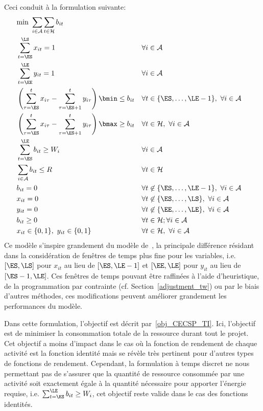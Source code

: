 Ceci conduit à la formulation suivante:
{\small
 \begin{align} &\text{min }
\sum_{i\in \A}\sum_{t \in \H} b_{it}
\label{obj_CECSP_TI}\\ &\sum_{t=\ES}^{\LS} x_{it} = 1 & &\forall i
\in \A \label{start_CECSP_TI}\\ &\sum_{t=\EE}^{\LE} y_{it} =
1 & & \forall i \in \A
\label{end_CECSP_TI}\\&\left(\sum_{\tau=\ES}^{t} x_{i\tau}
-\sum_{\tau=\ES+1}^{t} y_{i\tau}\right)\bmin \le b_{it} & &
\forall t \in \{\ES,\dots,\LE-1\},\ \forall i \in \A
\label{bmin_CECSP_TI}\\ &\left(\sum_{\tau=\ES}^{t} x_{i\tau} -
\sum_{\tau=\ES+1}^{t} y_{i\tau}\right)\bmax\ge b_{it}& & \forall t
\in \H ,\ \forall i \in \A \label{bmax_CECSP_TI}\\
&\sum_{t=\ES}^{\LE} b_{it} \ge W_i & & \forall i \in \A
\label{nrj_CECSP_TI}\\ &\sum_{i \in \A} b_{it} \le R & &
\forall t \in \H \label{res_CECSP_TI}\\ &b_{it} = 0 & &
\forall t \not\in \{\ES,\dots,\LE-1\},\ \forall i \in \A
\label{consNul_CECSP_TI}\\ &x_{it} = 0 & & \forall t \not\in
\{\ES,\dots,\LS\},\ \forall i \in \A \label{twx_CECSP_TI}\\
&y_{it} = 0 & & \forall t \not\in \{\EE,\dots,\LE\},\ \forall i
\in \A \label{twy_CECSP_TI}\\ & b_{it} \ge 0 & & \forall t
\in \H; \forall i \in \A \label{Bb_CECSP_TI}\\
&x_{it}\in \{0,1\},\ y_{it} \in \{0,1\} & & \forall t \in {\cal
H},\ \forall i \in \A \label{Bxy_CECSP_TI} \end{align}
}
Ce modèle s'inspire grandement du modèle
de~\cite{rapport_master_CECSP}, la principale différence résidant
dans la considération de fenêtres de temps plus fine pour les
variables, i.e. $[\ES,\LS]$ pour $x_{it}$ au lieu de
$[\ES,\LE-1]$ et $[\EE,\LE]$ pour $y_{it}$ au lieu de
$[\ES-1,\LE]$. Ces fenêtres de temps pouvant être raffinées à
l'aide d'heuristique, de la programmation par contrainte (cf.
Section~\ref{adjustment_tw}) ou par le biais d'autres méthodes,
ces modifications peuvent améliorer grandement les performances du
modèle.

Dans cette formulation, l'objectif est décrit
par~\eqref{obj_CECSP_TI}. Ici, l'objectif est de minimiser la
consommation totale de la ressource durant tout le projet. Cet
objectif a moins d'impact dans le cas où la fonction de rendement
de chaque activité est la fonction identité mais se révèle très
pertinent pour d'autres types de fonctions de rendement.
Cependant, la formulation à temps discret ne nous permettant pas
de s'assurer que la quantité de ressource consommée par une
activité soit exactement égale à la quantité nécessaire pour
apporter l'énergie requise, i.e. $\sum_{t=\ES}^{\LE} b_{it} \ge
W_i$, cet objectif reste valide dans le cas des fonctions
identités.

